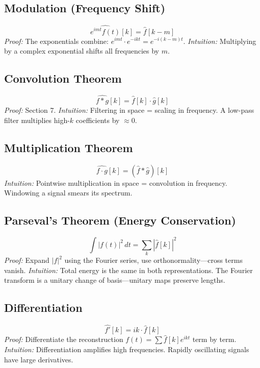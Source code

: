 \documentclass[11pt,a4paper]{article}
\theoremstyle{definition}
\begin{document}
\subsection{Modulation (Frequency Shift)}
\begin{equation}
    \widehat{e^{imt} f(t)}[k] = \hat{f}[k - m]
\end{equation}
\textit{Proof:} The exponentials combine: $e^{imt} \cdot e^{-ikt} = e^{-i(k-m)t}$. \quad
\textit{Intuition:} Multiplying by a complex exponential shifts all frequencies by $m$.

\subsection{Convolution Theorem}
\begin{equation}
    \widehat{f * g}[k] = \hat{f}[k] \cdot \hat{g}[k]
\end{equation}
\textit{Proof:} Section 7. \quad
\textit{Intuition:} Filtering in space = scaling in frequency. A low-pass filter multiplies high-$k$ coefficients by $\approx 0$.

\subsection{Multiplication Theorem}
\begin{equation}
    \widehat{f \cdot g}[k] = (\hat{f} * \hat{g})[k]
\end{equation}
\textit{Intuition:} Pointwise multiplication in space = convolution in frequency. Windowing a signal smears its spectrum.

\subsection{Parseval's Theorem (Energy Conservation)}
\begin{equation}
    \int |f(t)|^2 \, dt = \sum_k |\hat{f}[k]|^2
\end{equation}
\textit{Proof:} Expand $|f|^2$ using the Fourier series, use orthonormality---cross terms vanish. \quad
\textit{Intuition:} Total energy is the same in both representations. The Fourier transform is a unitary change of basis---unitary maps preserve lengths.

\subsection{Differentiation}
\begin{equation}
    \widehat{f'}[k] = ik \cdot \hat{f}[k]
\end{equation}
\textit{Proof:} Differentiate the reconstruction $f(t) = \sum \hat{f}[k] e^{ikt}$ term by term. \quad
\textit{Intuition:} Differentiation amplifies high frequencies. Rapidly oscillating signals have large derivatives.
\end{document}
